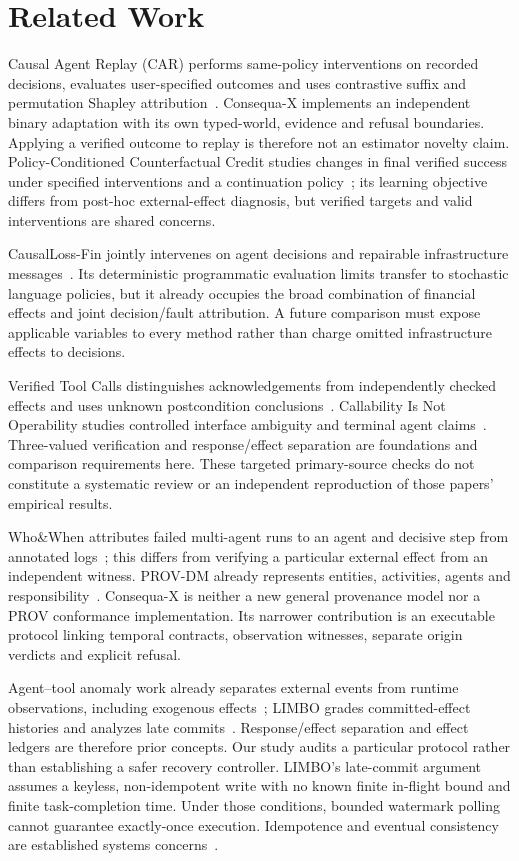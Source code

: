 \documentclass[conference]{IEEEtran}
\begin{document}
\section{Related Work}
Causal Agent Replay (CAR) performs same-policy interventions on recorded
decisions, evaluates user-specified outcomes and uses contrastive suffix and
permutation Shapley attribution~\cite{car}. Consequa-X implements an independent
binary adaptation with its own typed-world, evidence and refusal boundaries.
Applying a verified outcome to replay is therefore not an estimator novelty
claim. Policy-Conditioned Counterfactual Credit studies changes in final
verified success under specified interventions and a continuation
policy~\cite{pccc}; its learning objective differs from post-hoc external-effect
diagnosis, but verified targets and valid interventions are shared concerns.

CausalLoss-Fin jointly intervenes on agent decisions and repairable
infrastructure messages~\cite{causalloss}. Its deterministic programmatic
evaluation limits transfer to stochastic language policies, but it already
occupies the broad combination of financial effects and joint decision/fault
attribution. A future comparison must expose applicable variables to every
method rather than charge omitted infrastructure effects to decisions.

Verified Tool Calls distinguishes acknowledgements from independently checked
effects and uses unknown postcondition conclusions~\cite{verified}.
Callability Is Not Operability studies controlled interface ambiguity and
terminal agent claims~\cite{operability}. Three-valued verification and
response/effect separation are foundations and comparison requirements here.
These targeted primary-source checks do not constitute a systematic review or
an independent reproduction of those papers' empirical results.

Who\&When attributes failed multi-agent runs to an agent and decisive step
from annotated logs~\cite{whoandwhen}; this differs from verifying a particular
external effect from an independent witness. PROV-DM already represents entities,
activities, agents and responsibility~\cite{prov}. Consequa-X is neither a new
general provenance model nor a PROV conformance implementation. Its narrower
contribution is an executable protocol linking temporal contracts, observation
witnesses, separate origin verdicts and explicit refusal.

Agent--tool anomaly work already separates external events from runtime
observations, including exogenous effects~\cite{agenttool}; LIMBO grades
committed-effect histories and analyzes late commits~\cite{limbo}. Response/effect
separation and effect ledgers are therefore prior concepts. Our study audits
a particular protocol rather than establishing a safer recovery controller.
LIMBO's late-commit argument assumes a keyless, non-idempotent write with no
known finite in-flight bound and finite task-completion time. Under those
conditions, bounded watermark polling cannot guarantee exactly-once execution.
Idempotence and eventual consistency are established systems concerns~\cite{helland,vogels}.
\end{document}
